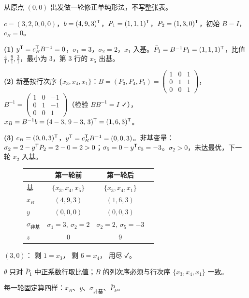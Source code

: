 从原点 $(0,0)$ 出发做一轮修正单纯形法，不写整张表。\par
{}$c=(3,2,0,0,0)$，$b=(4,9,3)^{\mathsf T}$，$P_1=(1,1,1)^{\mathsf T}$，$P_2=(1,3,0)^{\mathsf T}$，初始 $B=I$，$c_B=0$。\par
{}\textbf{(1)} $y^{\mathsf T}=c_B^{\mathsf T} B^{-1}=0$，$\sigma_1=3$，$\sigma_2=2$，$x_1$ 入基。$\bar P_1=B^{-1}P_1=(1,1,1)^{\mathsf T}$，比值 $\frac41,\frac91,\frac31$，最小为 3，第 3 行的 $x_5$ 出基。\par
\textbf{(2)} 新基按行次序 $\{x_3,x_4,x_1\}$：$B=(P_3,P_4,P_1)=\begin{pmatrix}1&0&1\\0&1&1\\0&0&1\end{pmatrix}$，$B^{-1}=\begin{pmatrix}1&0&-1\\0&1&-1\\0&0&1\end{pmatrix}$（检验 $BB^{-1}=I$ ✓），$x_B=B^{-1}b=(4-3,\,9-3,\,3)^{\mathsf T}=(1,6,3)^{\mathsf T}$。\par
\textbf{(3)} $c_B=(0,0,3)^{\mathsf T}$，$y^{\mathsf T}=c_B^{\mathsf T} B^{-1}=(0,0,3)$。非基变量：$\sigma_2=2-y^{\mathsf T} P_2=2-0=2>0$；$\sigma_5=0-y^{\mathsf T} e_3=-3$。$\sigma_2>0$，未达最优，下一轮 $x_2$ 入基。
\begin{figure}[!htbp]\centering
\begin{minipage}{0.4\linewidth}\centering
{}
\end{minipage}\hfill
\begin{minipage}{0.56\linewidth}\small
\begin{tabular}{@{}lccc@{}}\toprule
 & 第一轮前 & 第一轮后 & \\\midrule
基 & $\{x_3,x_4,x_5\}$ & $\{x_3,x_4,x_1\}$ & \\
$x_B$ & $(4,9,3)$ & $(1,6,3)$ & \\
$y$ & $(0,0,0)$ & $(0,0,3)$ & \\
$\sigma_{\text{非基}}$ & $\sigma_1=3,\ \sigma_2=2$ & $\sigma_2=2,\ \sigma_5=-3$ & \\
$z$ & 0 & 9 & \\\bottomrule
\end{tabular}
\end{minipage}
\end{figure}
$(3,0)$： 剩 $1=x_3$， 剩 $6=x_4$， 用尽 ✓。\par
{}$\theta$ 只对 $\bar P_1$ 中正系数行取比值；$B$ 的列次序必须与行次序 $\{x_3,x_4,x_1\}$ 一致。\par
{}每一轮固定算四样：$x_B$、$y$、$\sigma_{\text{非基}}$、$\bar P_k$。

